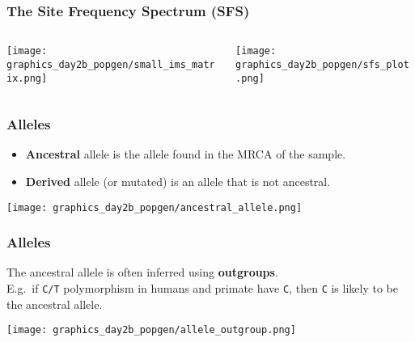 \documentclass{beamer}
\newcommand{\1}{\ensuremath{\mathbf{1}}}
\begin{document}
%
%
%
\begin{frame}\frametitle{The Site Frequency Spectrum (SFS)}
	\begin{columns}
	\begin{column}{0.25\textwidth}
		\begin{center}
			\texttt{[image: graphics\_day2b\_popgen/small\_ims\_matrix.png]}
		\end{center}
	\end{column}
	\begin{column}{0.75\textwidth}
		\begin{center}
			\texttt{[image: graphics\_day2b\_popgen/sfs\_plot.png]}
		\end{center}
	\end{column}
	\end{columns}
\end{frame}
%
%
%
\begin{frame}\frametitle{Alleles}
	\begin{itemize}
		\item \textbf{Ancestral} allele is the allele found in the MRCA of the sample.
		\item \textbf{Derived} allele (or mutated) is an allele that is not ancestral.
	\end{itemize}
	\begin{center}
		\texttt{[image: graphics\_day2b\_popgen/ancestral\_allele.png]}
	\end{center}
\end{frame}
%
%
%
\begin{frame}\frametitle{Alleles}
	The ancestral allele is often inferred using \textbf{outgroups}.\\
	E.g.\ if \texttt{C/T} polymorphism in humans and primate have \texttt{C}, then \texttt{C} is likely to be the ancestral allele.
	\begin{center}
		\texttt{[image: graphics\_day2b\_popgen/allele\_outgroup.png]}
	\end{center}
\end{frame}
\end{document}
